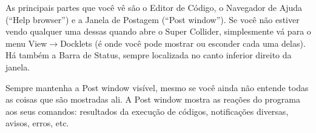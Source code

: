 As principais partes que você vê são o Editor de Código, o Navegador de Ajuda (“Help browser”) e a Janela de Postagem (“Post window”). Se você não estiver vendo qualquer uma dessas quando abre o Super Collider, simplesmente vá para o menu View$\rightarrow$Docklets (é onde você pode mostrar ou esconder cada uma delas). Há também a Barra de Status, sempre localizada no canto inferior direito da janela.

Sempre mantenha a Post window visível, mesmo se você ainda não entende todas as coisas que são mostradas ali. A Post window mostra as reações do programa aos seus comandos: resultados da execução de códigos, notificações diversas, avisos, erros, etc.

\bigskip
{}
\bigskip



